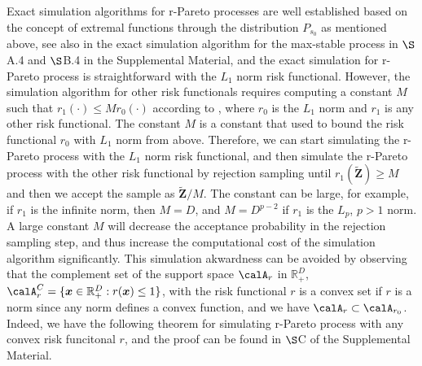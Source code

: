 \documentclass[12pt]{article}
\begin{document}
Exact simulation algorithms for r-Pareto processes are well established based on the concept of extremal functions \citep{Dombry.Engelke.Oesting:2016,Dombry.etal:2024} through the distribution $P_{s_0}$ as mentioned above, see also in the exact simulation algorithm for the max-stable process in $\S$A.4 and $\S$B.4 in the Supplemental Material, and the exact simulation for r-Pareto process is straightforward with the $L_1$ norm risk functional. However, the simulation algorithm for other risk functionals requires computing a constant $M$ such that $r_1 (\cdot) \leq Mr_0 (\cdot)$ according to \citet[Proposition 2]{Dombry.etal:2024}, where $r_0$ is the $L_1$ norm and $r_1$ is any other risk functional. The constant $M$ is a constant that used to bound the risk functional $r_0$ with $L_1$ norm from above. Therefore, we can start simulating the r-Pareto process with the $L_1$ norm risk functional, and then simulate the r-Pareto process with the other risk functional by rejection sampling until $r_1(\bm {\tilde Z})\geq M$ and then we accept the sample as $\bm{\tilde Z}/M$. The constant can be large, for example, if $r_1$ is the infinite norm, then $M=D$, and $M=D^{p-2}$ if $r_1$ is the $L_p$, $p>1$ norm. A large constant $M$ will decrease the acceptance probability in the rejection sampling step, and thus increase the computational cost of the simulation algorithm significantly. This simulation akwardness can be avoided by observing that the complement set of the support space $\calA_r$ in $\mathbb R_+^D$, $\calA_r^C=\{\bm x\in\mathbb R_+^D: r(\bm x)\leq 1\}$, with the risk functional $r$ is a convex set if $r$ is a norm since any norm defines a convex function, and we have $\calA_r\subset \calA_{r_0}$. Indeed, we have the following theorem for simulating r-Pareto process with any convex risk funcitonal $r$, and the proof can be found in $\S$C of the Supplemental Material.     
\end{document}
